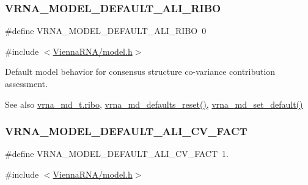 \subsubsection{\texorpdfstring{V\+R\+N\+A\+\_\+\+M\+O\+D\+E\+L\+\_\+\+D\+E\+F\+A\+U\+L\+T\+\_\+\+A\+L\+I\+\_\+\+R\+I\+BO}{VRNA\_MODEL\_DEFAULT\_ALI\_RIBO}}
{\footnotesize\ttfamily \#define V\+R\+N\+A\+\_\+\+M\+O\+D\+E\+L\+\_\+\+D\+E\+F\+A\+U\+L\+T\+\_\+\+A\+L\+I\+\_\+\+R\+I\+BO~0}



{\ttfamily \#include $<$\hyperlink{model_8h}{Vienna\+R\+N\+A/model.\+h}$>$}



Default model behavior for consensus structure co-\/variance contribution assessment. 

\begin{DoxySeeAlso}{See also}
\hyperlink{group__model__details_a3df2ae4bd9c133ef8ab92a53b1d035ec}{vrna\+\_\+md\+\_\+t.\+ribo}, \hyperlink{group__model__details_ga70834424cf804d149937de89f80ceb45}{vrna\+\_\+md\+\_\+defaults\+\_\+reset()}, \hyperlink{group__model__details_ga8ac6ff84936282436f822644bf841f66}{vrna\+\_\+md\+\_\+set\+\_\+default()} 
\end{DoxySeeAlso}
\mbox{\label{group__model__details_gaaaf3d73d6abc18d3889676952bfedb96}} 
\subsubsection{\texorpdfstring{V\+R\+N\+A\+\_\+\+M\+O\+D\+E\+L\+\_\+\+D\+E\+F\+A\+U\+L\+T\+\_\+\+A\+L\+I\+\_\+\+C\+V\+\_\+\+F\+A\+CT}{VRNA\_MODEL\_DEFAULT\_ALI\_CV\_FACT}}
{\footnotesize\ttfamily \#define V\+R\+N\+A\+\_\+\+M\+O\+D\+E\+L\+\_\+\+D\+E\+F\+A\+U\+L\+T\+\_\+\+A\+L\+I\+\_\+\+C\+V\+\_\+\+F\+A\+CT~1.}



{\ttfamily \#include $<$\hyperlink{model_8h}{Vienna\+R\+N\+A/model.\+h}$>$}



